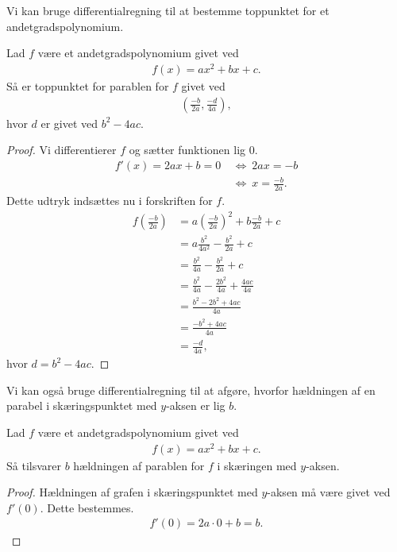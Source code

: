 \documentclass[12pt]{article}
\begin{document}
Vi kan bruge differentialregning til at bestemme toppunktet for et andetgradspolynomium.
\begin{setn}[Toppunktsformlen]
	Lad $f$ være et andetgradspolynomium givet ved
	\begin{align*}
		f(x) = ax^2+bx+c.
	\end{align*}
	Så er toppunktet for parablen for $f$ givet ved
	\begin{align*}
		\left(\frac{-b}{2a},\frac{-d}{4a} \right),
	\end{align*}
	hvor $d$ er givet ved $b^2-4ac$.
\end{setn}
\begin{proof}
	Vi differentierer $f$ og sætter funktionen lig $0$. 
	\begin{align*}
		f'(x) = 2ax+b=0 \ &\Leftrightarrow \ 2ax = -b \\
		&\Leftrightarrow \ x = \frac{-b}{2a}.
	\end{align*}
	Dette udtryk indsættes nu i forskriften for $f$.
	\begin{align*}
		f\left( \frac{-b}{2a}\right) &= a\left(\frac{-b}{2a}\right)^2 + b\frac{-b}{2a} + c\\
		&= a \frac{b^2}{4a^2} - \frac{b^2}{2a} + c \\
		&= \frac{b^2}{4a} - \frac{b^2}{2a} + c \\
		&= \frac{b^2}{4a} - \frac{2b^2}{4a} + \frac{4ac}{4a} \\
		&= \frac{b^2 - 2b^2 + 4ac}{4a} \\
		&= \frac{-b^2 + 4ac}{4a} \\
		&= \frac{-d}{4a},
	\end{align*}
	hvor $d=b^2-4ac$.
\end{proof}
Vi kan også bruge differentialregning til at afgøre, hvorfor hældningen af en parabel i skæringspunktet med $y$-aksen er lig $b$.
\begin{setn}
	Lad $f$ være et andetgradspolynomium givet ved
	\begin{align*}
		f(x) = ax^2+bx+c.
	\end{align*}
	Så tilsvarer $b$ hældningen af parablen for $f$ i skæringen med $y$-aksen. 
\end{setn}
\begin{proof}
	Hældningen af grafen i skæringspunktet med $y$-aksen må være givet ved $f'(0)$. Dette bestemmes.
	\begin{align*}
		f'(0) = 2a\cdot 0 + b = b.
	\end{align*}
\end{proof}
\end{document}
